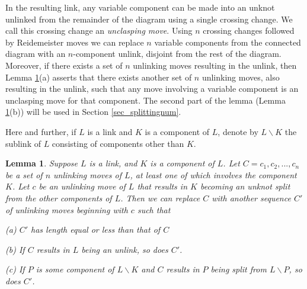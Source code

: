 \documentclass[12pt]{amsart}
\newtheorem{lemma}[thm]{Lemma}
\theoremstyle{definition}
\theoremstyle{remark}
\begin{document}
In the resulting link, any variable component can be made into an unknot unlinked from the remainder of the diagram using a single crossing change.
We call this crossing change an \emph{unclasping move}.
Using $n$ crossing changes followed by Reidemeister moves we can replace $n$ variable components from the connected diagram with an $n$-component unlink, disjoint from the rest of the diagram.
Moreover, if there exists a set of $n$ unlinking moves resulting in the unlink, then Lemma \ref{lem_unlinking}(a) asserts that there exists another set of $n$ unlinking moves, also resulting in the unlink, such that any move involving a variable component is an unclasping move for that component.
The second part of the lemma (Lemma \ref{lem_unlinking}(b)) will be used in Section \ref{sec_splittingnum}.

Here and further, if $L$ is a link and $K$ is a component of $L$, denote by $L \backslash K$ the sublink of $L$ consisting of components other than $K$.







\begin{lemma}
\label{lem_unlinking}
Suppose $L$ is a link, and $K$ is a component of $L$.
Let $C=c_1, c_2, ..., c_n$ be a set of $n$ unlinking moves of $L$, at least one of which involves the component $K$.
Let $c$ be an unlinking move of $L$ that results in $K$ becoming an unknot split from the other components of $L$.
Then we can replace $C$ with another sequence $C'$ of unlinking moves beginning with $c$ such that
\vspace{0.1in}

(a) $C'$ has length equal or less than that of $C$

(b) If $C$ results in $L$ being an unlink, so does $C'$.
\vspace{0.1in}

(c) If $P$ is some component of $L \backslash K$ and $C$ results in $P$ being split from $L \backslash P$, so does $C'$.
\end{lemma}
\end{document}
